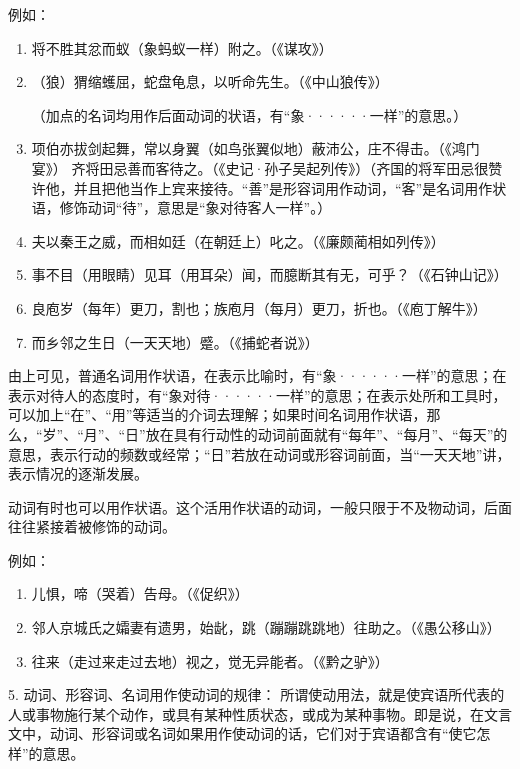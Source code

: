 例如：

\begin{enumerate}[label=\textcircled{\arabic*}]
	\item 将不胜其忿而蚁（象蚂蚁一样）附之。（《谋攻》）
	\item （狼）猬缩蠖屈，蛇盘龟息，以听命先生。（《中山狼传》）
	
	（加点的名词均用作后面动词的状语，有“象······一样”的意思。）
	\newpage

	\item 项伯亦拔剑起舞，常以身翼（如鸟张翼似地）蔽沛公，庄不得击。（《鸿门宴》）
	齐将田忌善而客待之。（《史记·孙子吴起列传》）（齐国的将军田忌很赞许他，并且把他当作上宾来接待。“善”是形容词用作动词，“客”是名词用作状语，修饰动词“待”，意思是“象对待客人一样”。）
	\item 夫以秦王之威，而相如廷（在朝廷上）叱之。（《廉颇蔺相如列传》）
	\item 事不目（用眼睛）见耳（用耳朵）闻，而臆断其有无，可乎？（《石钟山记》）
	\item 良庖岁（每年）更刀，割也；族庖月（每月）更刀，折也。（《庖丁解牛》）
	\item 而乡邻之生日（一天天地）蹙。（《捕蛇者说》）
\end{enumerate}

由上可见，普通名词用作状语，在表示比喻时，有“象······一样”的意思；在表示对待人的态度时，有“象对待······一样”的意思；在表示处所和工具时，可以加上“在”、“用”等适当的介词去理解；如果时间名词用作状语，那么，“岁”、“月”、“日”放在具有行动性的动词前面就有“每年”、“每月”、“每天”的意思，表示行动的频数或经常；“日”若放在动词或形容词前面，当“一天天地”讲，表示情况的逐渐发展。

动词有时也可以用作状语。这个活用作状语的动词，一般只限于不及物动词，后面往往紧接着被修饰的动词。

例如：
\newpage

\begin{enumerate}[label=\textcircled{\arabic*}]
	\item 儿惧，啼（哭着）告母。（《促织》）
	\item 邻人京城氏之孀妻有遗男，始龀，跳（蹦蹦跳跳地）往助之。（《愚公移山》）
	\item 往来（走过来走过去地）视之，觉无异能者。（《黔之驴》）
\end{enumerate}

5. 动词、形容词、名词用作使动词的规律：
所谓使动用法，就是使宾语所代表的人或事物施行某个动作，或具有某种性质状态，或成为某种事物。即是说，在文言文中，动词、形容词或名词如果用作使动词的话，它们对于宾语都含有“使它怎样”的意思。

